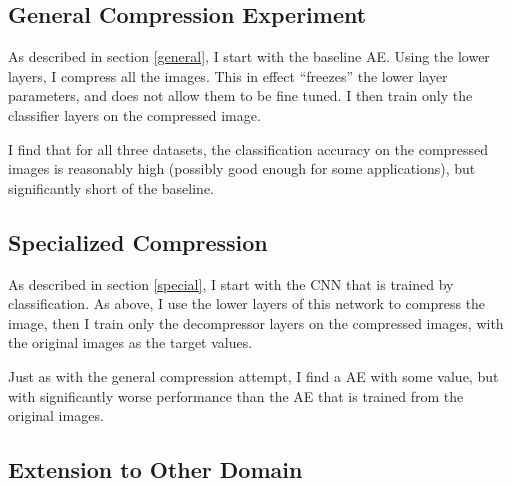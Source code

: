 \documentclass[twoside,11pt]{article}
\begin{document}

\subsection{General Compression Experiment}

As described in section \ref{general}, I start with the baseline AE.
Using the lower layers, I compress all the images. This in effect ``freezes'' the 
lower layer parameters, and does not allow them to be fine tuned. 
I then train only the classifier layers on the compressed image.


I find that for all three datasets, the classification accuracy on the compressed images
is reasonably high (possibly good enough for some applications), but significantly 
short of the baseline.


\subsection{Specialized Compression}

As described in section \ref{special}, I start with the CNN that is trained by classification.
As above, I use the lower layers of this network to compress the image, then I train
only the decompressor layers on the compressed images, with the original images
as the target values.


Just as with the general compression attempt, I find a AE with some value, but with 
significantly worse performance than the AE that is trained from the original images.


\subsection{Extension to Other Domain}
\end{document}
